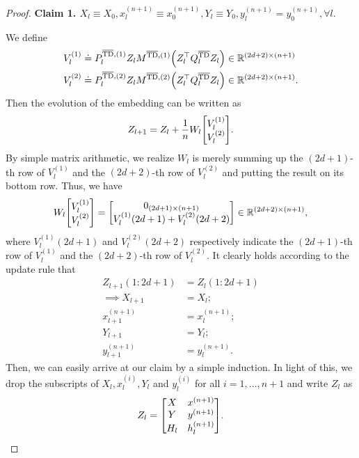 \documentclass{article}
\newcommand{\R}{\mathbb{R}}
\newcommand{\bartd}{\overline{\text{TD}}}
\begin{document}
\begin{proof}
    \textbf{Claim 1. $X_l \equiv X_0 , x_l^{(n+1)} \equiv x_0^{(n+1)}, Y_l \equiv Y_0, y_l^{(n+1)} = y_0^{(n+1)}, \forall l.$}

    We define
    \begin{align}
        V_l^{(1)} &\doteq P_l^{\bartd, (1)} Z_l M^{\bartd, (1)} \qty(Z_l^\top Q_l^{\bartd} Z_l) \in \R^{(2d+2)\times(n+1)}\\
        V_l^{(2)} &\doteq P_l^{\bartd, (2)} Z_l M^{\bartd, (2)} \qty(Z_l^\top Q_l^{\bartd} Z_l) \in \R^{(2d+2)\times(n+1)}.
    \end{align}
    Then the evolution of the embedding can be written as
    \begin{align}
        Z_{l+1} = Z_l + \frac{1}{n} W_l \mqty[V_l^{(1)}\\
                                              V_l^{(2)}].
    \end{align}
    By simple matrix arithmetic, we realize $W_l$ is merely summing up the $(2d+1)$-th row of $V_l^{(1)}$ and the $(2d+2)$-th row of $V_l^{(2)}$ and putting the result on its bottom row.
    Thus, we have
    \begin{align}
        W_l \mqty[V_l^{(1)}\\
                  V_l^{(2)}]
         = \mqty[0_{(2d+1)\times(n+1)}\\
                 V_l^{(1)}(2d+1) + V_l^{(2)}(2d+2)] \in \R^{(2d+2) \times (n+1)},
    \end{align}
    where $V_l^{(1)}(2d+1)$ and $V_l^{(2)}(2d+2)$ respectively indicate the $(2d+1)$-th row of $V_l^{(1)}$ and the $(2d+2)$-th row of $V_l^{(2)}$.
    It clearly holds according to the update rule that
    \begin{align}
        Z_{l+1}(1:2d+1) &= Z_l (1: 2d+1)\\
        \implies X_{l+1} &= X_l;\\
        x_{l+1}^{(n+1)} &= x_l^{(n+1)};\\
        Y_{l+1} &= Y_l;\\
        y_{l+1}^{(n+1)} &= y_l^{(n+1)}.
    \end{align}
    Then, we can easily arrive at our claim by a simple induction.
    In light of this, we drop the subscripts of $X_l, x_l^{(i)}, Y_l$ and $y_l^{(i)}$ for all $i = 1, \dots, n+1$ and write $Z_l$ as
    \begin{align}
        Z_l = \mqty[X & x^{(n+1)}\\
                    Y & y^{(n+1)}\\
                    H_l & h_l^{(n+1)}].
    \end{align}


\end{proof}
\end{document}
